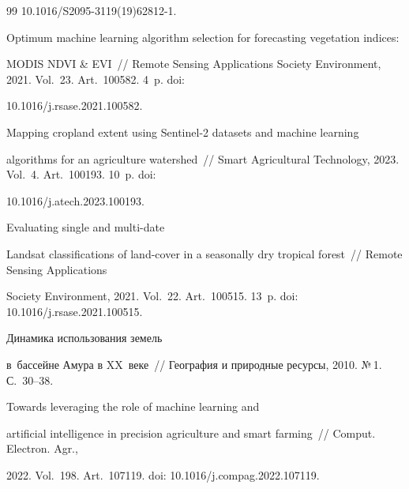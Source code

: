 {{\begin{thebibliography}{99}
10.1016\!/\!S2095-3119(19)62812-1.




 Optimum machine learning algorithm selection for forecasting vegetation indices: 

MODIS NDVI \& EVI~/\!\!/ Remote Sensing Applications Society Environment, 2021. Vol.~23. Art.~100582. 4~p. doi: 

10.1016\!/\!j.rsase.2021.100582.




 Mapping cropland extent using Sentinel-2 datasets and machine learning 

algorithms for an agriculture watershed~/\!\!/ Smart Agricultural Technology, 2023. Vol.~4. Art.~100193. 10~p. doi: 

10.1016\!/\!j.atech.2023.100193.


 Evaluating single and multi-date 

Landsat classifications of land-cover in a seasonally dry tropical forest~/\!\!/ Remote Sensing Applications 

Society Environment, 2021. Vol.~22. Art.~100515. 13~p. doi: 10.1016\!/\!j.rsase.2021.100515.


 Динамика использования земель 

в~бассейне Амура в XX~веке~/\!\!/ География и природные ресурсы, 2010. №\,1. С.~30--38.


 Towards leveraging the role of machine learning and 

artificial intelligence in precision agriculture and smart farming~/\!\!/ Comput. Electron. Agr., 

2022. Vol.~198. Art.~107119. doi: 10.1016\!/\!j.compag.2022.107119.

     \end{thebibliography}

} }







\vspace*{-6pt}



